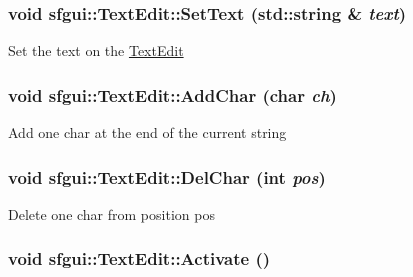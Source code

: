 \hypertarget{classsfgui_1_1TextEdit_16ffefa7f0c0d6e01275b8a2afa5975e}{
\subsubsection[SetText]{\setlength{\rightskip}{0pt plus 5cm}void sfgui::TextEdit::SetText (std::string \& {\em text})}}
\label{classsfgui_1_1TextEdit_16ffefa7f0c0d6e01275b8a2afa5975e}




Set the text on the \hyperlink{classsfgui_1_1TextEdit}{TextEdit} \hypertarget{classsfgui_1_1TextEdit_203952f38ce3bd68695597fee4b4397b}{
\subsubsection[AddChar]{\setlength{\rightskip}{0pt plus 5cm}void sfgui::TextEdit::AddChar (char {\em ch})}}
\label{classsfgui_1_1TextEdit_203952f38ce3bd68695597fee4b4397b}




Add one char at the end of the current string \hypertarget{classsfgui_1_1TextEdit_dc95dab7bac1c41d0cebff1268f80c22}{
\subsubsection[DelChar]{\setlength{\rightskip}{0pt plus 5cm}void sfgui::TextEdit::DelChar (int {\em pos})}}
\label{classsfgui_1_1TextEdit_dc95dab7bac1c41d0cebff1268f80c22}




Delete one char from position pos \hypertarget{classsfgui_1_1TextEdit_bcd256e053ae8f13a5c7f919f79c03c9}{
\subsubsection[Activate]{\setlength{\rightskip}{0pt plus 5cm}void sfgui::TextEdit::Activate ()}}
\label{classsfgui_1_1TextEdit_bcd256e053ae8f13a5c7f919f79c03c9}




